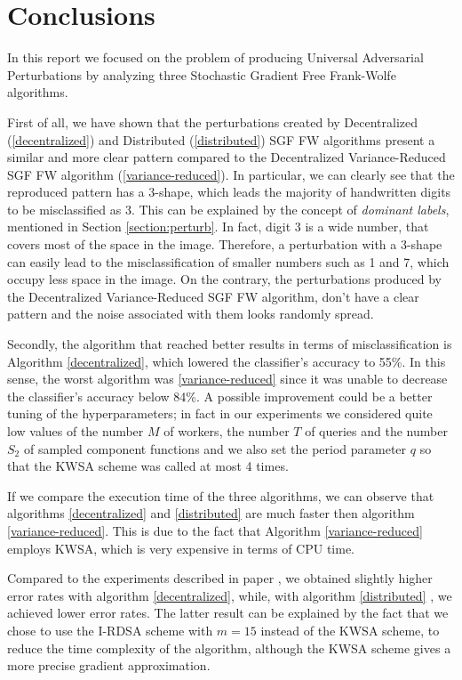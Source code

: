 \section{Conclusions}
In this report we focused on the problem of producing Universal Adversarial Perturbations by analyzing three
Stochastic Gradient Free Frank-Wolfe algorithms.

First of all, we have shown that the perturbations created by Decentralized (\ref{decentralized}) and Distributed (\ref{distributed})
SGF FW algorithms present a similar and more clear pattern compared to the Decentralized Variance-Reduced SGF FW
algorithm (\ref{variance-reduced}). In particular, we can clearly see that the reproduced pattern has a 3-shape, which
leads the majority of handwritten digits to be misclassified as 3. This can be explained by the concept of \textit{dominant labels},
mentioned in Section \ref{section:perturb}. In fact, digit 3 is a wide number, that covers most of the space in the image. Therefore, a
perturbation with a 3-shape can easily lead to the misclassification of smaller numbers such as 1 and 7, which occupy
less space in the image. On the contrary, the perturbations produced by the Decentralized Variance-Reduced SGF FW algorithm,
don't have a clear pattern and the noise associated with them looks randomly spread.

Secondly, the algorithm that reached better results in terms of misclassification is Algorithm \ref{decentralized},
which lowered the classifier's accuracy to 55\%. In this sense, the worst algorithm was \ref{variance-reduced} since
it was unable to decrease the classifier's accuracy below 84\%. A possible improvement could be a better tuning of the hyperparameters; in fact in our experiments we considered quite low values of the number $M$ of workers, the number $T$ of queries and the number $S_2$ of sampled component functions and we also set the period parameter $q$ so that the KWSA scheme was called at most 4 times. 

If we compare the execution time of the three algorithms, we can observe that algorithms \ref{decentralized} and \ref{distributed}
are much faster then algorithm \ref{variance-reduced}. This is due to the fact that Algorithm \ref{variance-reduced}
employs KWSA, which is very expensive in terms of CPU time.

Compared to the experiments described in paper \cite{A3}, we obtained slightly higher error rates with algorithm
\ref{decentralized}, while, with algorithm \ref{distributed} , we achieved lower error rates. The latter result can be
explained by the fact that we chose to use the I-RDSA scheme with $m=15$ instead of the KWSA scheme, to reduce the time
complexity of the algorithm, although the KWSA scheme gives a more precise gradient approximation. 

